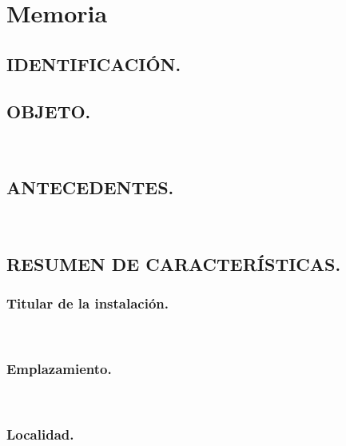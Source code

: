 \documentclass[12pt]{article}
\begin{document}

\hypersetup{linkcolor=black}

\tableofcontents\thispagestyle{empty}


\hypersetup{
    linkcolor=blue,
    citecolor=blue,
    urlcolor=blue
}



    \setcounter{section}{1} %
    \section{Memoria}
    \label{Memoria}

        \subsection{IDENTIFICACIÓN.}
        
        


        \clearpage
        \subsection{OBJETO.}
        ~

        \subsection{ANTECEDENTES.}
        ~

        \subsection{RESUMEN DE CARACTERÍSTICAS.}
            \subsubsection{Titular de la instalación.}
            ~
            \subsubsection{Emplazamiento.}
            ~
            \subsubsection{Localidad.}
\end{document}
